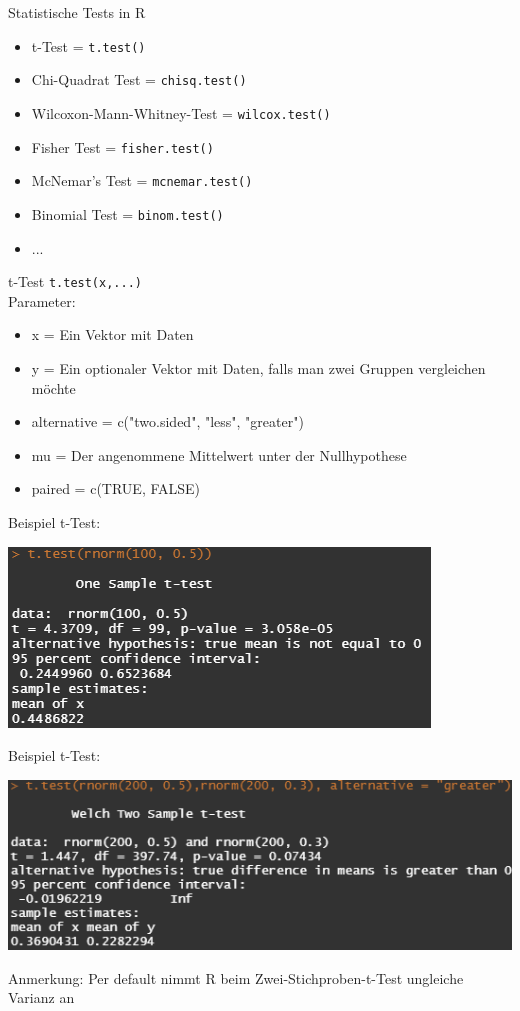 \documentclass[xcolor=dvipsnames, aspectratio = 169]{beamer}
\begin{document}
\begin{frame}[fragile]{Statistische Tests in R}
	\begin{itemize}
		\item t-Test = \verb+t.test()+
		\item Chi-Quadrat Test = \verb+chisq.test()+
		\item Wilcoxon-Mann-Whitney-Test = \verb+wilcox.test()+
		\item Fisher Test = \verb+fisher.test()+
		\item McNemar's Test = \verb+mcnemar.test()+
		\item Binomial Test = \verb+binom.test()+
		\item ...
	\end{itemize}
\end{frame}


\begin{frame}[fragile]{t-Test}
\verb+t.test(x,...)+\\
Parameter:
	\begin{itemize}
		\item x = Ein Vektor mit Daten
		\item y = Ein optionaler Vektor mit Daten, falls man zwei Gruppen vergleichen möchte
		\item alternative = c("two.sided", "less", "greater")
		\item mu = Der angenommene Mittelwert unter der Nullhypothese
		\item paired = c(TRUE, FALSE)
	\end{itemize}
\end{frame}

\begin{frame}[fragile]{Beispiel t-Test:}	
	\begin{center}
		\includegraphics{OneSampleTtest}
	\end{center}
\end{frame}

\begin{frame}[fragile]{Beispiel t-Test:}	
	\begin{center}
		\includegraphics{TwoSampleTtest}
	\end{center}
Anmerkung: Per default nimmt R beim Zwei-Stichproben-t-Test ungleiche Varianz an
\end{frame}
\end{document}

